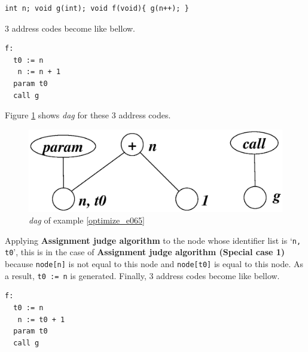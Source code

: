 \begin{Example}
\label{optimize_e065}
\begin{verbatim}
int n; void g(int); void f(void){ g(n++); }
\end{verbatim}
3 address codes become like bellow.
\begin{verbatim}
f:
  t0 := n
   n := n + 1
  param t0
  call g
\end{verbatim}
Figure \ref{optimize_e066} shows {\em dag} for these 3 address codes.
\begin{figure}[htbp]
\begin{center}
\includegraphics[width=1.0\linewidth,height=0.328\linewidth]{opt027.eps}
\caption{{\em dag} of example \ref{optimize_e065}}
\label{optimize_e066}
\end{center}
\end{figure}
Applying {\bf Assignment judge
 algorithm} to the node whose identifier list is `{\tt{n, t0}}',
this is in the case
of {\bf Assignment judge algorithm (Special case 1)}
because {\tt{node[n]}} is not equal to this node and
{\tt{node[t0]}} is equal to this node.
As a result, {\tt{t0 := n}} is generated.
Finally, 3 address codes become like bellow.
\begin{verbatim}
f:
  t0 := n
   n := t0 + 1
  param t0
  call g
\end{verbatim}
\end{Example}

